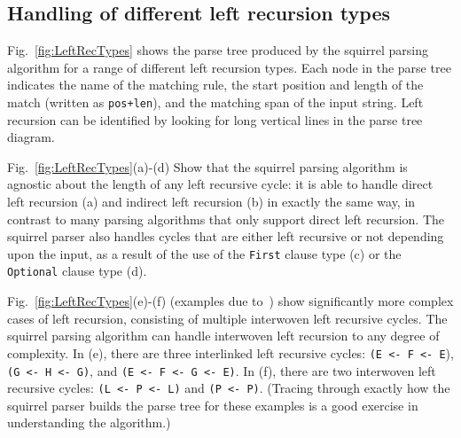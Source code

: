 \documentclass[manuscript]{acmart}
\begin{document}
\subsection{Handling of different left recursion types}

Fig.~\ref{fig:LeftRecTypes} shows the parse tree produced by the squirrel parsing algorithm for a range of different left recursion types. Each node in the parse tree indicates the name of the matching rule, the start position and length of the match (written as \texttt{pos+len}), and the matching span of the input string. Left recursion can be identified by looking for long vertical lines in the parse tree diagram.

Fig.~\ref{fig:LeftRecTypes}(a)-(d) Show that the squirrel parsing algorithm is agnostic about the length of any left recursive cycle: it is able to handle direct left recursion (a) and indirect left recursion (b) in exactly the same way, in contrast to many parsing algorithms that only support direct left recursion. %
The squirrel parser also handles cycles that are either left recursive or not depending upon the input, as a result of the use of the \texttt{First} clause type (c) or the \texttt{Optional} clause type (d).

Fig.~\ref{fig:LeftRecTypes}(e)-(f) (examples due to~\cite{pegged}) show significantly more complex cases of left recursion, consisting of multiple interwoven left recursive cycles. The squirrel parsing algorithm can handle interwoven left recursion to any degree of complexity. In (e), there are three interlinked left recursive cycles: \texttt{(E <- F <- E}), \texttt{(G <- H <- G)}, and \texttt{(E <- F <- G <- E)}. In (f), there are two interwoven left recursive cycles: \texttt{(L <- P <- L)} and \texttt{(P <- P)}. (Tracing through exactly how the squirrel parser builds the parse tree for these examples is a good exercise in understanding the algorithm.)
\end{document}
